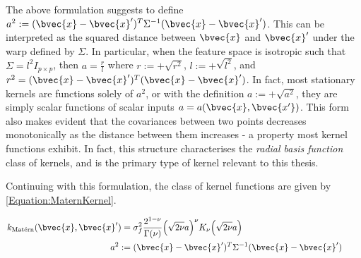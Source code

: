 				The above formulation suggests to define $a^{2} := (\bvec{x} - \bvec{x}')^{T} \Sigma^{-1} (\bvec{x} - \bvec{x}')$. This can be interpreted as the squared distance between $\bvec{x}$ and $\bvec{x}'$ under the warp defined by $\Sigma$. In particular, when the feature space is isotropic such that $\Sigma = l^{2} I_{p \times p}$, then $a = \frac{r}{l}$ where $r := +\sqrt{r^{2}}$, $l := +\sqrt{l^{2}}$, and $r^{2} = (\bvec{x} - \bvec{x}')^{T} (\bvec{x} - \bvec{x}')$. In fact, most stationary kernels are functions solely of $a^{2}$, or with the definition $a := +\sqrt{a^{2}}$, they are simply scalar functions of scalar inputs $a = a (\bvec{x}, \bvec{x'})$. This form also makes evident that the covariances between two points decreases monotonically as the distance between them increases - a property most kernel functions exhibit. In fact, this structure characterises the \textit{radial basis function} class of kernels, and is the primary type of kernel relevant to this thesis.
				
				Continuing with this formulation, the \matern class of kernel functions are given by \eqref{Equation:MaternKernel}.
				
				\begin{equation}
					\left.
						\begin{aligned}
							k_{\mathrm{\maternmath}}(\bvec{x}, \bvec{x}') =& \; \sigma_{f}^{2} \frac{2^{1 - \nu}}{\Gamma(\nu)} \Big( \sqrt{2 \nu} a \Big)^{\nu} K_{\nu}\Big( \sqrt{2 \nu} a \Big) \\
							a^{2} :=& \; (\bvec{x} - \bvec{x}')^{T} \Sigma^{-1} (\bvec{x} - \bvec{x}')
						\end{aligned}
					\qquad \right.
				\label{Equation:MaternKernel}
				\end{equation}
							

